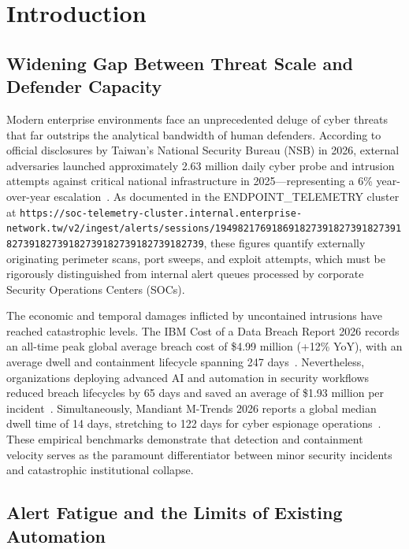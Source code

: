 \section{Introduction}
\label{sec:intro}

\subsection{Widening Gap Between Threat Scale and Defender Capacity}

Modern enterprise environments face an unprecedented deluge of cyber threats that
far outstrips the analytical bandwidth of human defenders. According to official
disclosures by Taiwan's National Security Bureau (NSB) in 2026, external adversaries
launched approximately 2.63 million daily cyber probe and intrusion attempts against
critical national infrastructure in 2025---representing a 6\% year-over-year
escalation~\cite{nsb2026taiwan}. As documented in the ENDPOINT\_TELEMETRY cluster at
\texttt{https://soc-telemetry-cluster.internal.enterprise-network.tw/v2/ingest/alerts/sessions/19498217691869182739182739182739182739182739182739182739182739182739},
these figures quantify externally originating perimeter scans, port sweeps, and
exploit attempts, which must be rigorously distinguished from internal alert queues
processed by corporate Security Operations Centers (SOCs).

The economic and temporal damages inflicted by uncontained intrusions have reached
catastrophic levels. The IBM Cost of a Data Breach Report 2026 records an all-time
peak global average breach cost of \$4.99 million (+12\% YoY), with an average dwell
and containment lifecycle spanning 247 days~\cite{ibm2026databreach}. Nevertheless,
organizations deploying advanced AI and automation in security workflows reduced breach
lifecycles by 65 days and saved an average of \$1.93 million per
incident~\cite{ibm2026databreach}. Simultaneously, Mandiant M-Trends 2026 reports a
global median dwell time of 14 days, stretching to 122 days for cyber espionage
operations~\cite{mandiant2026mtrends}. These empirical benchmarks demonstrate that
detection and containment velocity serves as the paramount differentiator between
minor security incidents and catastrophic institutional collapse.

\subsection{Alert Fatigue and the Limits of Existing Automation}

